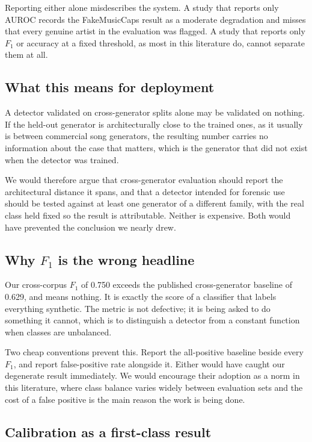 Reporting either alone misdescribes the system. A study that reports only AUROC
records the FakeMusicCaps result as a moderate degradation and misses that every
genuine artist in the evaluation was flagged. A study that reports only $F_1$ or
accuracy at a fixed threshold, as most in this literature do, cannot separate
them at all.

\subsection{What this means for deployment}

A detector validated on cross-generator splits alone may be validated on nothing.
If the held-out generator is architecturally close to the trained ones, as it
usually is between commercial song generators, the resulting number carries
no information about the case that matters, which is the generator that did not
exist when the detector was trained.

We would therefore argue that cross-generator evaluation should report the
architectural distance it spans, and that a detector intended for forensic use
should be tested against at least one generator of a different family, with the
real class held fixed so the result is attributable. Neither is expensive. Both
would have prevented the conclusion we nearly drew.

\subsection{Why $F_1$ is the wrong headline}

Our cross-corpus $F_1$ of 0.750 exceeds the published cross-generator baseline of
0.629, and means nothing. It is exactly the score of a classifier that labels
everything synthetic. The metric is not defective; it is being asked to do
something it cannot, which is to distinguish a detector from a constant
function when classes are unbalanced.

Two cheap conventions prevent this. Report the all-positive baseline beside every
$F_1$, and report false-positive rate alongside it. Either would have caught our
degenerate result immediately. We would encourage their adoption as a norm in
this literature, where class balance varies widely between evaluation sets and
the cost of a false positive is the main reason the work is being done.

\subsection{Calibration as a first-class result}

